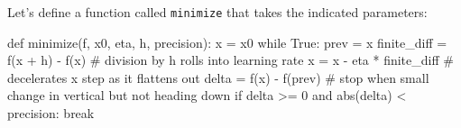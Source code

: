 \documentclass[titlepage]{tufte-book}
\begin{document}
\begin{fullwidth}
\noindent {}

\noindent Let's define a function called {\tt minimize} that takes the indicated parameters:

\begin{pyverbatim}
def minimize(f, x0, eta, h, precision):
    x = x0
    while True:
        prev = x
        finite_diff = f(x + h) - f(x)	 # division by h rolls into learning rate
        x = x - eta * finite_diff 		# decelerates x step as it flattens out
        delta = f(x) - f(prev)
        # stop when small change in vertical but not heading down
        if delta >= 0 and abs(delta) < precision: break
\end{pyverbatim}


\end{fullwidth}
\end{document}
